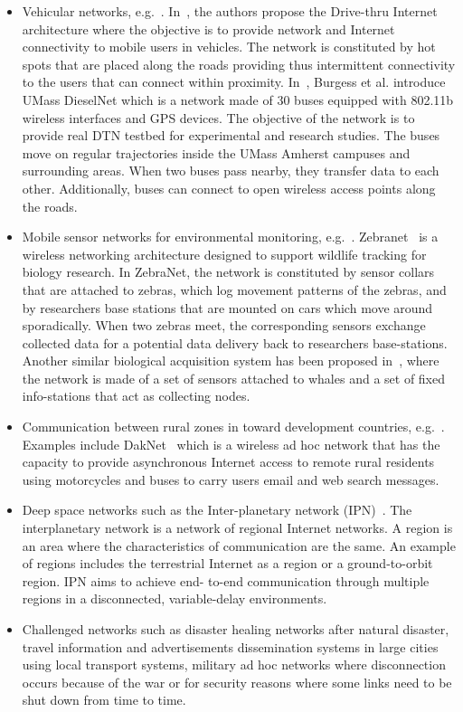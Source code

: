 \begin{itemize}
\item{Vehicular networks, e.g.~\cite{Levine:MaxProp, DriveThru}. In~\cite{DriveThru}, the authors propose the Drive-thru Internet architecture where the objective is to provide network and Internet connectivity
to mobile users in vehicles. The network is constituted by hot spots that are placed along the roads providing thus intermittent connectivity to the users that can
connect within proximity. In~\cite{Levine:MaxProp}, Burgess et al. introduce UMass DieselNet which is a network made of 30 buses equipped with 802.11b wireless interfaces and GPS devices. The objective of the network is to provide real DTN testbed for experimental and research studies. The buses move on regular trajectories inside the UMass Amherst campuses and surrounding areas. When two buses pass nearby, they transfer data to each other. Additionally, buses can connect to open wireless access points
along the roads.}
\item{Mobile sensor networks for environmental monitoring, e.g.~\cite{zebranet02,WirelessInfostation}. Zebranet~\cite{zebranet02} is a wireless networking architecture designed to support wildlife tracking for biology research. In ZebraNet, the network is constituted by sensor collars that are attached to zebras, which log movement patterns of the zebras, and by researchers base stations that are mounted on cars which move around sporadically. When two zebras meet, the corresponding sensors exchange collected data for a potential data delivery back to researchers base-stations. Another similar biological acquisition system has been proposed in~\cite{WirelessInfostation}, where the network is made of a set of sensors attached to whales and a set of fixed info-stations that act as collecting nodes.}
\item{Communication between rural zones in toward development countries, e.g.~\cite{Brewer:DTNdeveloping}. Examples include DakNet~\cite{Brewer:DTNdeveloping} which is a wireless ad hoc network that has the capacity to provide asynchronous Internet access to remote rural residents using motorcycles and buses to carry users email and web search messages.}
\item{Deep space networks such as the Inter-planetary network (IPN)~\cite{interplanetary03}. The interplanetary network is a network of regional Internet networks. A region is an area where the characteristics of communication are the same. An example of regions includes the terrestrial Internet as a region or a ground-to-orbit region. IPN aims to achieve end-
to-end communication through multiple regions in a disconnected, variable-delay environments.}
\item{Challenged networks such as disaster healing networks after natural disaster, travel information and advertisements dissemination systems in large cities using local transport systems, military ad hoc networks where disconnection occurs because of the war or for security reasons where some links need to be shut down from time to time.}
\end{itemize}

